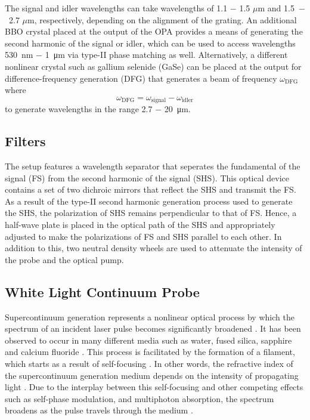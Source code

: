 The signal and idler wavelengths can take wavelengths of 1.1 $-$ 1.5 $\mu$m  and 1.5~$-$~2.7 $\mu$m, respectively, depending on the alignment of the grating. An additional BBO crystal placed at the output of the OPA provides a means of generating the second harmonic of the signal or idler, which can be used to access wavelengths \SI{530}{nm} $-$ \SI{1}{\micro \meter} via type-II phase matching as well. Alternatively, a different nonlinear crystal such as gallium selenide (GaSe) can be placed at the output for difference-frequency generation (DFG) that generates a beam of frequency $\omega_\text{DFG}$ where
\begin{equation}
	\omega_\text{DFG} = \omega_\text{signal} - \omega_\text{idler}
\end{equation}
to generate wavelengths in the range 2.7 $-$ \SI{20}{\micro\meter}.
\subsection{Filters}

The setup features a wavelength separator that seperates the fundamental of the signal (FS) from the second harmonic of the signal (SHS). This optical device contains a set of two dichroic mirrors that reflect the SHS and transmit the FS. As a result of the type-II second harmonic generation process used to generate the SHS, the polarization of SHS remains perpendicular to that of FS. Hence, a half-wave plate is placed in the optical path of the SHS and appropriately adjusted to make the polarizations of FS and SHS parallel to each other. In addition to this, two neutral density wheels are used to attenuate the intensity of the probe and the optical pump.

\subsection{White Light Continuum Probe}

\label{section:white_light_probe}
Supercontinuum generation represents a nonlinear optical process by which the spectrum of an incident laser pulse becomes significantly broadened \cite{alfano1970emission, alfano1970observation, alfano1989supercontinuum, dubietis2017ultrafast}. It has been observed to occur in many different media such as water, fused silica, sapphire and calcium fluoride \cite{alfano1989supercontinuum, dubietis2017ultrafast}. This process is facilitated by the formation of a filament, which starts as a result of self-focusing \cite{alfano1989supercontinuum, dubietis2017ultrafast}. In other words, the refractive index of the supercontinuum generation medium depends on the intensity of propagating light \cite{alfano1989supercontinuum, dubietis2017ultrafast}. Due to the interplay between this self-focusing and other competing effects such as self-phase modulation, and multiphoton absorption, the spectrum  broadens as the pulse travels through the medium \cite{alfano1989supercontinuum, dubietis2017ultrafast}.

